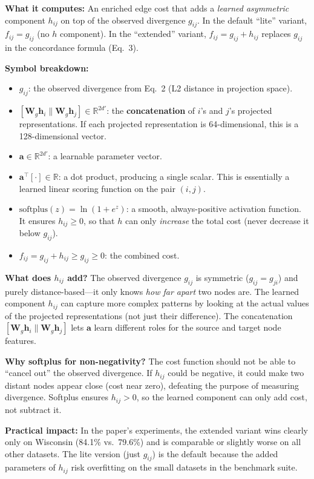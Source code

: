 \documentclass[11pt,a4paper]{article}
\newcommand{\R}{\mathbb{R}}
\newcommand{\bW}{\mathbf{W}}
\newcommand{\bh}{\mathbf{h}}
\theoremstyle{definition}
\theoremstyle{plain}
\begin{document}
\textbf{What it computes:}
An enriched edge cost that adds a \emph{learned asymmetric} component $h_{ij}$
on top of the observed divergence $g_{ij}$.
In the default ``lite'' variant, $f_{ij} = g_{ij}$ (no $h$ component).
In the ``extended'' variant, $f_{ij} = g_{ij} + h_{ij}$ replaces $g_{ij}$ in the
concordance formula (Eq.~3).

\textbf{Symbol breakdown:}
\begin{itemize}
  \item $g_{ij}$: the observed divergence from Eq.~2 (L2 distance in projection space).
  \item $[\bW_g \bh_i \| \bW_g \bh_j] \in \R^{2d'}$: the \textbf{concatenation}
    of $i$'s and $j$'s projected representations.
    If each projected representation is 64-dimensional, this is a 128-dimensional
    vector.
  \item $\mathbf{a} \in \R^{2d'}$: a learnable parameter vector.
  \item $\mathbf{a}^\top [\cdot] \in \R$: a dot product, producing a single scalar.
    This is essentially a learned linear scoring function on the pair $(i, j)$.
  \item $\mathrm{softplus}(z) = \ln(1 + e^z)$: a smooth, always-positive activation function.
    It ensures $h_{ij} \geq 0$, so that $h$ can only \emph{increase} the total
    cost (never decrease it below $g_{ij}$).
  \item $f_{ij} = g_{ij} + h_{ij} \geq g_{ij} \geq 0$: the combined cost.
\end{itemize}

\textbf{What does $h_{ij}$ add?}
The observed divergence $g_{ij}$ is symmetric ($g_{ij} = g_{ji}$) and purely
distance-based---it only knows \emph{how far apart} two nodes are.
The learned component $h_{ij}$ can capture more complex patterns by looking at
the actual values of the projected representations (not just their difference).
The concatenation $[\bW_g \bh_i \| \bW_g \bh_j]$ lets $\mathbf{a}$ learn
different roles for the source and target node features.

\textbf{Why softplus for non-negativity?}
The cost function should not be able to ``cancel out'' the observed divergence.
If $h_{ij}$ could be negative, it could make two distant nodes appear close
(cost near zero), defeating the purpose of measuring divergence.
Softplus ensures $h_{ij} > 0$, so the learned component can only add cost, not
subtract it.

\textbf{Practical impact:}
In the paper's experiments, the extended variant wins clearly only on Wisconsin
(84.1\% vs.\ 79.6\%) and is comparable or slightly worse on all other datasets.
The lite version (just $g_{ij}$) is the default because the added parameters
of $h_{ij}$ risk overfitting on the small datasets in the benchmark suite.
\end{document}
